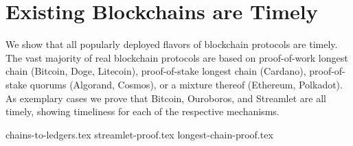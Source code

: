 \section{Existing Blockchains are Timely}\label{sec:possible}

We show that all popularly deployed flavors of blockchain protocols are timely.
The vast majority of real blockchain protocols are based on proof-of-work longest chain
(Bitcoin, Doge, Litecoin),
proof-of-stake longest chain
(Cardano),
proof-of-stake quorums
(Algorand, Cosmos),
or a mixture thereof
(Ethereum, Polkadot).
As exemplary cases we prove that Bitcoin, Ouroboros, and Streamlet
are all timely, showing timeliness for each of the respective mechanisms.

{chains-to-ledgers.tex}
{streamlet-proof.tex}
{longest-chain-proof.tex}
